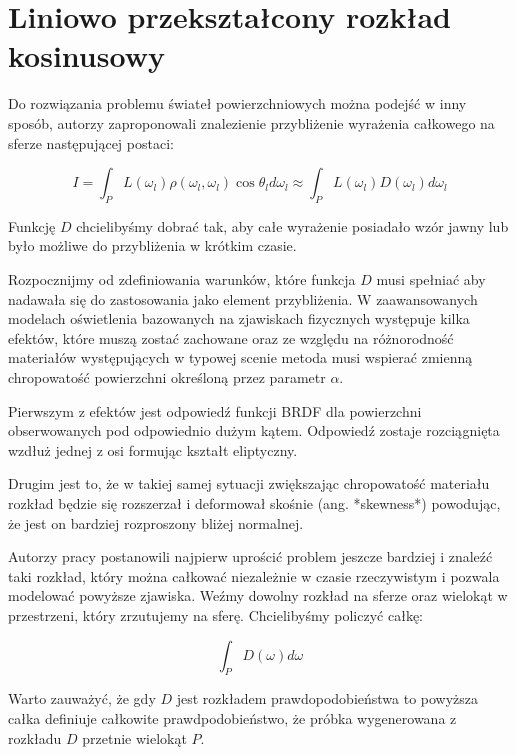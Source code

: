 \documentclass[../main.tex]{subfiles}
\begin{document}
\chapter{Liniowo przekształcony rozkład kosinusowy}

Do rozwiązania problemu świateł powierzchniowych można podejść w inny sposób,
autorzy \cite{ltc_heitz} zaproponowali znalezienie przybliżenie wyrażenia
całkowego na sferze następującej postaci:

\begin{displaymath}
I = \int_{P} {
  L(\omega_l)
  \rho(\omega_l, \omega_l)
  \cos \theta_l
  d \omega_l
}
\approx
\int_{P} {
  L(\omega_l)
  D(\omega_l)
  d \omega_l
}
\end{displaymath}

Funkcję $D$ chcielibyśmy dobrać tak, aby całe wyrażenie posiadało wzór jawny
lub było możliwe do przybliżenia w krótkim czasie.

Rozpocznijmy od zdefiniowania warunków, które funkcja $D$ musi spełniać aby
nadawała się do zastosowania jako element przybliżenia. W zaawansowanych
modelach oświetlenia bazowanych na zjawiskach fizycznych występuje kilka
efektów, które muszą zostać zachowane oraz ze względu na różnorodność
materiałów występujących w typowej scenie metoda musi wspierać zmienną
chropowatość powierzchni określoną przez parametr $\alpha$.

Pierwszym z efektów jest odpowiedź funkcji BRDF dla powierzchni obserwowanych
pod odpowiednio dużym kątem. Odpowiedź zostaje rozciągnięta wzdłuż jednej z
osi formując kształt eliptyczny.

Drugim jest to, że w takiej samej sytuacji zwiększając chropowatość materiału
rozkład będzie się rozszerzał i deformował skośnie (ang. *skewness*) powodując,
że jest on bardziej rozproszony bliżej normalnej.

Autorzy pracy \cite{ltc_heitz} postanowili najpierw uprościć problem jeszcze
bardziej i znaleźć taki rozkład, który można całkować niezależnie w czasie
rzeczywistym i pozwala modelować powyższe zjawiska. Weźmy dowolny rozkład na
sferze oraz wielokąt  w przestrzeni, który zrzutujemy na sferę. Chcielibyśmy
policzyć całkę:

\begin{displaymath}
\int_P {
  D(\omega)
  d \omega
}
\end{displaymath}

Warto zauważyć, że gdy $D$ jest rozkładem prawdopodobieństwa to powyższa całka
definiuje całkowite prawdpodobieństwo, że próbka wygenerowana z rozkładu $D$
przetnie wielokąt $P$.
\end{document}
